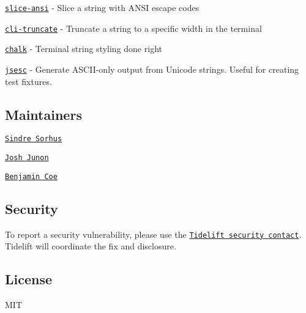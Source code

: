 \begin{DoxyItemize}
\item \href{https://github.com/chalk/slice-ansi}{\tt slice-\/ansi} -\/ Slice a string with A\+N\+SI escape codes
\item \href{https://github.com/sindresorhus/cli-truncate}{\tt cli-\/truncate} -\/ Truncate a string to a specific width in the terminal
\item \href{https://github.com/chalk/chalk}{\tt chalk} -\/ Terminal string styling done right
\item \href{https://github.com/mathiasbynens/jsesc}{\tt jsesc} -\/ Generate A\+S\+C\+I\+I-\/only output from Unicode strings. Useful for creating test fixtures.
\end{DoxyItemize}

\subsection*{Maintainers}


\begin{DoxyItemize}
\item \href{https://github.com/sindresorhus}{\tt Sindre Sorhus}
\item \href{https://github.com/qix-}{\tt Josh Junon}
\item \href{https://github.com/bcoe}{\tt Benjamin Coe}
\end{DoxyItemize}

\subsection*{Security}

To report a security vulnerability, please use the \href{https://tidelift.com/security}{\tt Tidelift security contact}. Tidelift will coordinate the fix and disclosure.

\subsection*{License}

M\+IT 